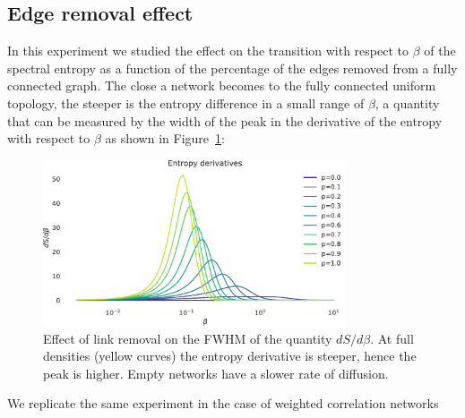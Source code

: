 \documentclass[a4paper]{article}
\begin{document}
\subsection{Edge removal effect}
In this experiment we studied the effect on the transition with respect to $\beta$ of the spectral entropy as a function of the percentage of the edges removed from a fully connected graph.
The close a network becomes to the fully connected uniform topology, the steeper is the entropy difference in a small range of $\beta$, a quantity that can be measured by the width of the peak in the derivative of the entropy with respect to $\beta$ as shown in Figure~\ref{fig:beta_deriv_clique_removal}:
\begin{figure}
\centering
\includegraphics[width=0.8\textwidth]{entropy_derivative_er.pdf}
\caption{Effect of link removal on the FWHM of the quantity $dS/d\beta$. At full densities (yellow curves) the entropy derivative is steeper, hence the peak is higher. Empty networks have a slower rate of diffusion. }
\label{fig:beta_deriv_clique_removal}
\end{figure}

We replicate the same experiment in the case of weighted correlation networks
\end{document}

